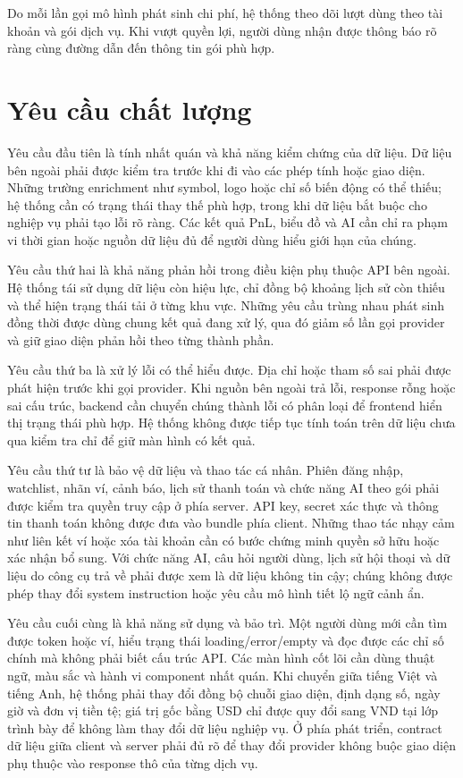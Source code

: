 Do mỗi lần gọi mô hình phát sinh chi phí, hệ thống theo dõi lượt dùng theo tài khoản và gói dịch vụ. Khi vượt quyền lợi, người dùng nhận được thông báo rõ ràng cùng đường dẫn đến thông tin gói phù hợp.

\section{Yêu cầu chất lượng}
\label{sec:quality_requirements}

Yêu cầu đầu tiên là tính nhất quán và khả năng kiểm chứng của dữ liệu. Dữ liệu bên ngoài phải được kiểm tra trước khi đi vào các phép tính hoặc giao diện. Những trường enrichment như symbol, logo hoặc chỉ số biến động có thể thiếu; hệ thống cần có trạng thái thay thế phù hợp, trong khi dữ liệu bắt buộc cho nghiệp vụ phải tạo lỗi rõ ràng. Các kết quả PnL, biểu đồ và AI cần chỉ ra phạm vi thời gian hoặc nguồn dữ liệu đủ để người dùng hiểu giới hạn của chúng.

Yêu cầu thứ hai là khả năng phản hồi trong điều kiện phụ thuộc API bên ngoài. Hệ thống tái sử dụng dữ liệu còn hiệu lực, chỉ đồng bộ khoảng lịch sử còn thiếu và thể hiện trạng thái tải ở từng khu vực. Những yêu cầu trùng nhau phát sinh đồng thời được dùng chung kết quả đang xử lý, qua đó giảm số lần gọi provider và giữ giao diện phản hồi theo từng thành phần.

Yêu cầu thứ ba là xử lý lỗi có thể hiểu được. Địa chỉ hoặc tham số sai phải được phát hiện trước khi gọi provider. Khi nguồn bên ngoài trả lỗi, response rỗng hoặc sai cấu trúc, backend cần chuyển chúng thành lỗi có phân loại để frontend hiển thị trạng thái phù hợp. Hệ thống không được tiếp tục tính toán trên dữ liệu chưa qua kiểm tra chỉ để giữ màn hình có kết quả.

Yêu cầu thứ tư là bảo vệ dữ liệu và thao tác cá nhân. Phiên đăng nhập, watchlist, nhãn ví, cảnh báo, lịch sử thanh toán và chức năng AI theo gói phải được kiểm tra quyền truy cập ở phía server. API key, secret xác thực và thông tin thanh toán không được đưa vào bundle phía client. Những thao tác nhạy cảm như liên kết ví hoặc xóa tài khoản cần có bước chứng minh quyền sở hữu hoặc xác nhận bổ sung. Với chức năng AI, câu hỏi người dùng, lịch sử hội thoại và dữ liệu do công cụ trả về phải được xem là dữ liệu không tin cậy; chúng không được phép thay đổi system instruction hoặc yêu cầu mô hình tiết lộ ngữ cảnh ẩn.

Yêu cầu cuối cùng là khả năng sử dụng và bảo trì. Một người dùng mới cần tìm được token hoặc ví, hiểu trạng thái loading/error/empty và đọc được các chỉ số chính mà không phải biết cấu trúc API. Các màn hình cốt lõi cần dùng thuật ngữ, màu sắc và hành vi component nhất quán. Khi chuyển giữa tiếng Việt và tiếng Anh, hệ thống phải thay đổi đồng bộ chuỗi giao diện, định dạng số, ngày giờ và đơn vị tiền tệ; giá trị gốc bằng USD chỉ được quy đổi sang VND tại lớp trình bày để không làm thay đổi dữ liệu nghiệp vụ. Ở phía phát triển, contract dữ liệu giữa client và server phải đủ rõ để thay đổi provider không buộc giao diện phụ thuộc vào response thô của từng dịch vụ.

